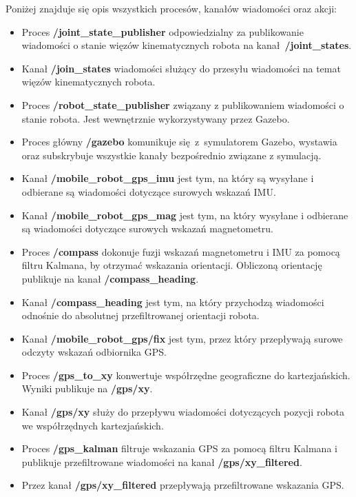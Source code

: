 {{        \newpage
        Poniżej znajduje się opis wszystkich procesów, kanałów wiadomości oraz akcji:
    
        \begin{itemize}
            \item Proces \textbf{/joint\_state\_publisher} odpowiedzialny za publikowanie wiadomości o stanie więzów kinematycznych robota na kanał~\textbf{/joint\_states}.
            \item Kanał \textbf{/join\_states} wiadomości służący do przesyłu wiadomości na temat więzów kinematycznych robota.
            \item Proces \textbf{/robot\_state\_publisher} związany z publikowaniem wiadomości o stanie robota. Jest wewnętrznie wykorzystywany przez Gazebo.
            \item  Proces główny \textbf{/gazebo} komunikuje się~z~symulatorem Gazebo, wystawia oraz subskrybuje wszystkie kanały bezpośrednio związane z symulacją.
            \item Kanał \textbf{/mobile\_robot\_gps\_imu} jest tym, na który są wysyłane i odbierane są wiadomości dotyczące surowych wskazań IMU.
            \item Kanał \textbf{/mobile\_robot\_gps\_mag} jest tym, na który wysyłane i odbierane są wiadomości dotyczące surowych wskazań magnetometru.
            \item Proces \textbf{/compass} dokonuje fuzji wskazań magnetometru i IMU za pomocą filtru Kalmana, by otrzymać wskazania orientacji. Obliczoną orientację publikuje na kanał \textbf{/compass\_heading}.
            \item Kanał \textbf{/compass\_heading} jest tym, na który przychodzą wiadomości odnośnie do absolutnej przefiltrowanej orientacji robota.
            \item Kanał \textbf{/mobile\_robot\_gps/fix} jest tym, przez który przepływają surowe odczyty wskazań odbiornika GPS.
            \item Proces \textbf{/gps\_to\_xy} konwertuje współrzędne geograficzne do kartezjańskich. Wyniki publikuje na \textbf{/gps/xy}.
            \item Kanał \textbf{/gps/xy} służy do przepływu wiadomości dotyczących pozycji robota we współrzędnych kartezjańskich.
            \item Proces \textbf{/gps\_kalman} filtruje wskazania GPS 
            za pomocą filtru Kalmana i publikuje przefiltrowane wiadomości na kanał \textbf{/gps/xy\_filtered}.
            \item Przez kanał \textbf{/gps/xy\_filtered} przepływają przefiltrowane wskazania GPS.

\end{itemize}}}
